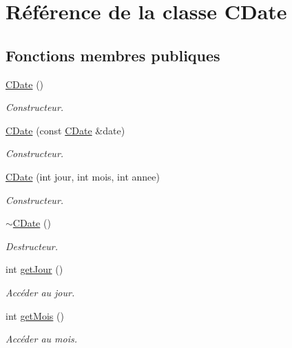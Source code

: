 \hypertarget{class_c_date}{
\section{Référence de la classe CDate}
\label{class_c_date}
}
\subsection*{Fonctions membres publiques}
\begin{DoxyCompactItemize}
\item 
\hyperlink{class_c_date_abaab9d809338418c9a749ce479fcea61}{CDate} ()
\begin{DoxyCompactList}\small\item\em Constructeur. \item\end{DoxyCompactList}\item 
\hyperlink{class_c_date_ad4cd3f57aa3dd701ffb1e57753f73a6a}{CDate} (const \hyperlink{class_c_date}{CDate} \&date)
\begin{DoxyCompactList}\small\item\em Constructeur. \item\end{DoxyCompactList}\item 
\hyperlink{class_c_date_a674c65d8051308ba639825a012f20eb9}{CDate} (int jour, int mois, int annee)
\begin{DoxyCompactList}\small\item\em Constructeur. \item\end{DoxyCompactList}\item 
\hyperlink{class_c_date_a27cb391423bff726cd1a9b1bed10eea9}{$\sim$CDate} ()
\begin{DoxyCompactList}\small\item\em Destructeur. \item\end{DoxyCompactList}\item 
int \hyperlink{class_c_date_a1b2130af68061448ba2f2eff741570ac}{getJour} ()
\begin{DoxyCompactList}\small\item\em Accéder au jour. \item\end{DoxyCompactList}\item 
int \hyperlink{class_c_date_a499fa44735a061481ed6d47e3382fa6a}{getMois} ()
\begin{DoxyCompactList}\small\item\em Accéder au mois. \item\end{DoxyCompactList}\item 

\end{DoxyCompactItemize}
